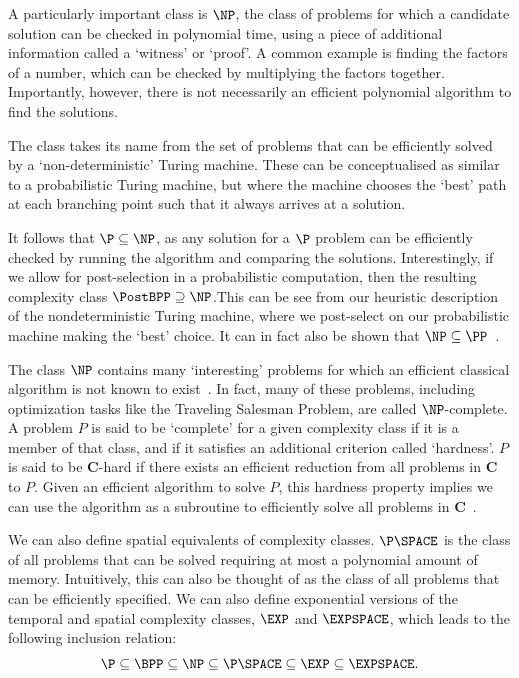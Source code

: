 A particularly important class is $\NP$, the class of problems for which a candidate solution can be checked in polynomial time, using a piece of additional information called a `witness' or `proof'. A common example is finding the factors of a number, which can be checked by multiplying the factors together. Importantly, however, there is not necessarily an efficient polynomial algorithm to find the solutions.\par
The class takes its name from the set of problems that can be efficiently solved by a `non-deterministic' Turing machine.  These can be conceptualised as similar to a probabilistic Turing machine, but where the machine chooses the `best' path at each branching point such that it always arrives at a solution.\par
It follows that $\P\subseteq \NP$, as any solution for a $\P$ problem can be efficiently checked by running the algorithm and comparing the solutions. Interestingly, if we allow for post-selection in a probabilistic computation, then the resulting complexity class $\PostBPP \supseteq \NP$.This can be see from our heuristic description of the nondeterministic Turing machine, where we post-select on our probabilistic machine making the `best' choice. It can in fact also be shown that $\NP\subseteq \PP$~\cite{Gill1974}.\par
The class $\NP$ contains many `interesting' problems for which an efficient classical algorithm is not known to exist~\cite{Nielsen2000}. In fact, many of these problems, including optimization tasks like the Traveling Salesman Problem, are called $\NP$-complete. A problem $P$ is said to be `complete' for a given complexity class if it is a member of that class, and if it satisfies an additional criterion called `hardness'. $P$ is said to be $\mathbf{C}$-hard if there exists an efficient reduction from all problems in $\mathbf{C}$ to $P$. Given an efficient algorithm to solve $P$, this hardness property implies we can use the algorithm as a subroutine to efficiently solve all problems in $\mathbf{C}$~\cite{Nielsen2000}.\par
We can also define spatial equivalents of complexity classes. $\P\SPACE$ is the class of all problems that can be solved requiring at most a polynomial amount of memory. Intuitively, this can also be thought of as the class of all problems that can be efficiently specified. We can also define exponential versions of the temporal and spatial complexity classes, $\EXP$ and $\EXPSPACE$, which leads to the following inclusion relation:
\[\P\subseteq\BPP\subseteq \NP \subseteq \P\SPACE \subseteq \EXP \subseteq \EXPSPACE. \]
